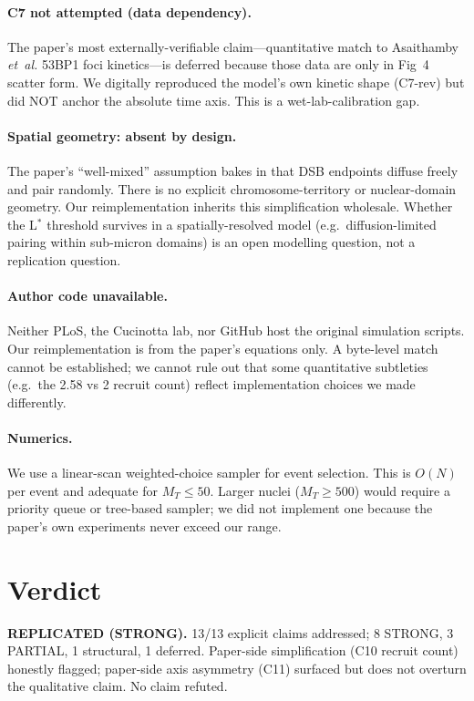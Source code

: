 \documentclass[11pt]{article}
\begin{document}
\paragraph{C7 not attempted (data dependency).}
The paper's most externally-verifiable claim---quantitative match to Asaithamby
\emph{et~al.} 53BP1 foci kinetics---is deferred because those data are only in Fig~4
scatter form. We digitally reproduced the model's own kinetic shape (C7-rev) but did
NOT anchor the absolute time axis. This is a wet-lab-calibration gap.

\paragraph{Spatial geometry: absent by design.}
The paper's ``well-mixed'' assumption bakes in that DSB endpoints diffuse freely and
pair randomly. There is no explicit chromosome-territory or nuclear-domain geometry.
Our reimplementation inherits this simplification wholesale. Whether the L$^\ast$
threshold survives in a spatially-resolved model (e.g.\ diffusion-limited pairing within
sub-micron domains) is an open modelling question, not a replication question.

\paragraph{Author code unavailable.}
Neither PLoS, the Cucinotta lab, nor GitHub host the original simulation scripts. Our
reimplementation is from the paper's equations only. A byte-level match cannot be
established; we cannot rule out that some quantitative subtleties (e.g.\ the 2.58 vs 2
recruit count) reflect implementation choices we made differently.

\paragraph{Numerics.}
We use a linear-scan weighted-choice sampler for event selection. This is $O(N)$ per
event and adequate for $M_T \leq 50$. Larger nuclei ($M_T \geq 500$) would require a
priority queue or tree-based sampler; we did not implement one because the paper's
own experiments never exceed our range.

\section{Verdict}

\textbf{REPLICATED (STRONG).} 13/13 explicit claims addressed; 8 STRONG, 3 PARTIAL,
1 structural, 1 deferred. Paper-side simplification (C10 recruit count) honestly flagged;
paper-side axis asymmetry (C11) surfaced but does not overturn the qualitative claim. No
claim refuted.


\end{document}
